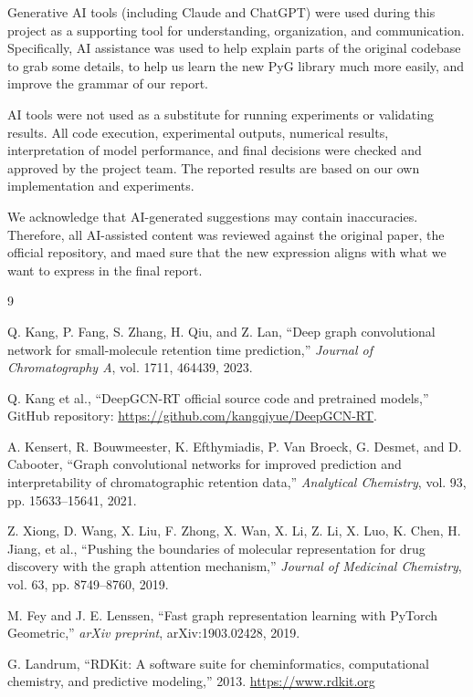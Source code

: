 Generative AI tools (including Claude and ChatGPT) were used during this project as a supporting tool for understanding, organization, and communication. Specifically, AI assistance was used to help explain parts of the original codebase to grab some details, to help us learn the new PyG library much more easily, and improve the grammar of our report.

AI tools were not used as a substitute for running experiments or validating results. All code execution, experimental outputs, numerical results, interpretation of model performance, and final decisions were checked and approved by the project team. The reported results are based on our own implementation and experiments.

We acknowledge that AI-generated suggestions may contain inaccuracies. Therefore, all AI-assisted content was reviewed against the original paper, the official repository, and maed sure that the new expression aligns with what we want to express in the final report.

\begin{thebibliography}{9}

    Q. Kang, P. Fang, S. Zhang, H. Qiu, and Z. Lan,
    \newblock ``Deep graph convolutional network for small-molecule retention time prediction,''
    \newblock \emph{Journal of Chromatography A}, vol. 1711, 464439, 2023.

    Q. Kang et al.,
    \newblock ``DeepGCN-RT official source code and pretrained models,''
    \newblock GitHub repository: \url{https://github.com/kangqiyue/DeepGCN-RT}.

    A. Kensert, R. Bouwmeester, K. Efthymiadis, P. Van Broeck, G. Desmet, and D. Cabooter,
    \newblock ``Graph convolutional networks for improved prediction and interpretability of chromatographic retention data,''
    \newblock \emph{Analytical Chemistry}, vol. 93, pp. 15633--15641, 2021.

    Z. Xiong, D. Wang, X. Liu, F. Zhong, X. Wan, X. Li, Z. Li, X. Luo, K. Chen, H. Jiang, et al.,
    \newblock ``Pushing the boundaries of molecular representation for drug discovery with the graph attention mechanism,''
    \newblock \emph{Journal of Medicinal Chemistry}, vol. 63, pp. 8749--8760, 2019.

    M. Fey and J. E. Lenssen,
    \newblock ``Fast graph representation learning with PyTorch Geometric,''
    \newblock \emph{arXiv preprint}, arXiv:1903.02428, 2019.

    G. Landrum,
    \newblock ``RDKit: A software suite for cheminformatics, computational chemistry, and predictive modeling,'' 2013.
    \newblock \url{https://www.rdkit.org}

\end{thebibliography}

